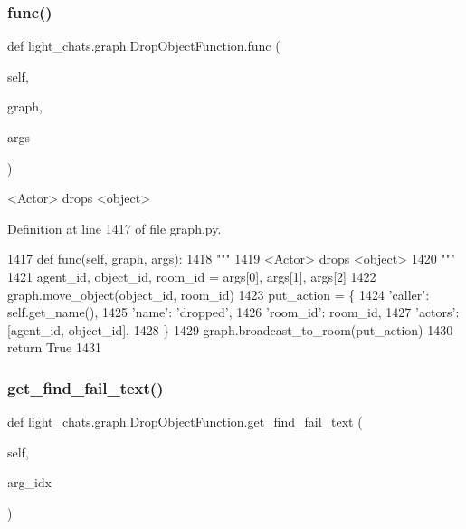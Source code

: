 \subsubsection{\texorpdfstring{func()}{func()}}
{\footnotesize\ttfamily def light\+\_\+chats.\+graph.\+Drop\+Object\+Function.\+func (\begin{DoxyParamCaption}\item[{}]{self,  }\item[{}]{graph,  }\item[{}]{args }\end{DoxyParamCaption})}

\begin{DoxyVerb}<Actor> drops <object>
\end{DoxyVerb}
 

Definition at line 1417 of file graph.\+py.


\begin{DoxyCode}
1417     \textcolor{keyword}{def }func(self, graph, args):
1418         \textcolor{stringliteral}{"""}
1419 \textcolor{stringliteral}{        <Actor> drops <object>}
1420 \textcolor{stringliteral}{        """}
1421         agent\_id, object\_id, room\_id = args[0], args[1], args[2]
1422         graph.move\_object(object\_id, room\_id)
1423         put\_action = \{
1424             \textcolor{stringliteral}{'caller'}: self.get\_name(),
1425             \textcolor{stringliteral}{'name'}: \textcolor{stringliteral}{'dropped'},
1426             \textcolor{stringliteral}{'room\_id'}: room\_id,
1427             \textcolor{stringliteral}{'actors'}: [agent\_id, object\_id],
1428         \}
1429         graph.broadcast\_to\_room(put\_action)
1430         \textcolor{keywordflow}{return} \textcolor{keyword}{True}
1431 
\end{DoxyCode}
\mbox{\label{classlight__chats_1_1graph_1_1DropObjectFunction_a8b23f2a71c27f14580a978f1b07e0471}} 
\subsubsection{\texorpdfstring{get\+\_\+find\+\_\+fail\+\_\+text()}{get\_find\_fail\_text()}}
{\footnotesize\ttfamily def light\+\_\+chats.\+graph.\+Drop\+Object\+Function.\+get\+\_\+find\+\_\+fail\+\_\+text (\begin{DoxyParamCaption}\item[{}]{self,  }\item[{}]{arg\+\_\+idx }\end{DoxyParamCaption})}



